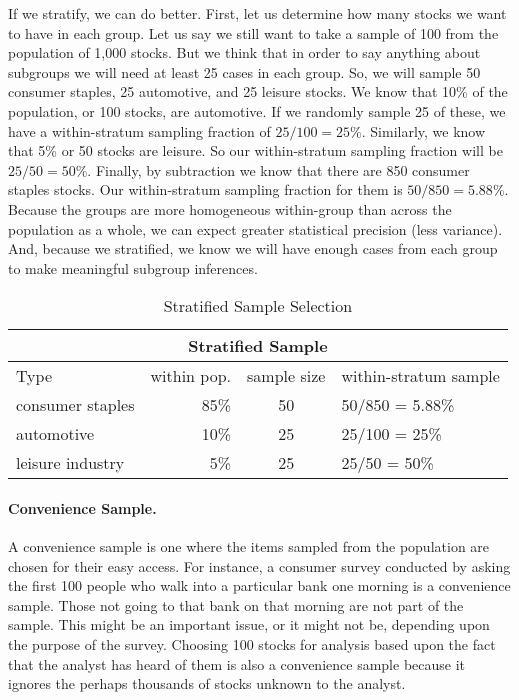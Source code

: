 If we stratify, we can do better. First, let us determine how many stocks we want to have in each group. Let us say we still want to take a sample of 100 from the population of 1,000 stocks. But we think that in order to say anything about subgroups we will need at least 25 cases in each group. So, we will sample 50 consumer staples, 25 automotive, and 25 leisure stocks. We know that 10\% of the population, or 100 stocks, are automotive. If we randomly sample 25 of these, we have a within-stratum sampling fraction of $25/100 = 25\%$. Similarly, we know that 5\% or 50 stocks are leisure. So our within-stratum sampling fraction will be $25/50 = 50\%$. Finally, by subtraction we know that there are 850 consumer staples stocks. Our within-stratum sampling fraction for them is $50/850 =  5.88\%$. Because the groups are more homogeneous within-group than across the population as a whole, we can expect greater statistical precision (less variance). And, because we stratified, we know we will have enough cases from each group to make meaningful subgroup inferences.

\begin{table}[htbp]
   \centering
   \begin{tabular}{@{} lrcl @{}}
      \toprule
      \multicolumn{4}{c}{Stratified Sample} \\
      \hline
       Type    & within pop. & sample size & within-stratum sample \\
      \hline
      consumer staples  & 85\% & 50 & 50/850 = 5.88\% \\
      automotive   & 10\% & 25 & 25/100 = 25\% \\
      leisure industry & 5\%  & 25 & 25/50 = 50\% \\
      \bottomrule
   \end{tabular}
   \caption{Stratified Sample Selection}
   \label{tab:strat-sample}
\end{table}

\paragraph{Convenience Sample.}
A convenience sample is one where the items sampled from the population are chosen for their easy access. For instance, a consumer survey conducted by asking the first 100 people who walk into a particular bank one morning is a convenience sample. Those not going to that bank on that morning are not part of the sample. This might be an important issue, or it might not be, depending upon the purpose of the survey. Choosing 100 stocks for analysis based upon the fact that the analyst has heard of them is also a convenience sample because it ignores the perhaps thousands of stocks unknown to the analyst.

